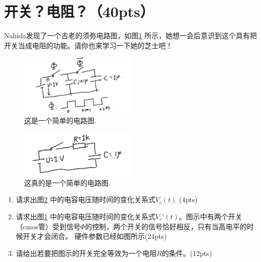 \section{开关？电阻？（40pts）}
Nahida发现了一个古老的须弥电路图，如图\ref{switch} 所示，她想一会后意识到这个具有把开关当成电阻的功能。请你也来学习一下她的芝士吧！
\begin{figure}[htbp]
	\centering
	\includegraphics[width=0.5\textwidth]{switch}
	\caption{这是一个简单的电路图.}
	\label{switch}
\end{figure}
\begin{figure}[htbp]
	\centering
	\includegraphics[width=0.5\textwidth]{RC}
	\caption{这真的是一个简单的电路图.}
	\label{RC}
\end{figure}
\begin{enumerate}
	\item 请求出图\ref{RC} 中的电容电压随时间的变化关系式\(V_c(t)\) (4pts)
	\item 请求出图\ref{switch} 中的电容电压随时间的变化关系式\(V_c'(t)\)。图示中有两个开关（cmos管）受到信号\(\Phi\)的控制，两个开关的信号恰好相反，只有当高电平的时候开关才会闭合。 硬件参数已经如图所示(24pts)
	\item 请给出若要把图示的开关完全等效为一个电阻\(R\)的条件。(12pts)
\end{enumerate}